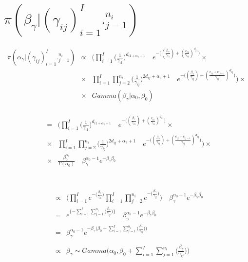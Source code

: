 \documentclass[10pt]{report}
\theoremstyle{plain}
\begin{document}
\section{$\pi(\beta_\gamma|(\gamma_{ij})_{i=1}^I._{j=1}^{n_i})$}
\begin{eqnarray*}
\pi(\alpha_\gamma|(\gamma_{ij})_{i=1}^I._{j=1}^{n_i}) &\propto& \Bigg(\prod_{i=1}^I \bigg(\frac{1}{\gamma_{i1}}\bigg)^{d_{i1+\alpha_\gamma+1}}\quad e^{-\big((\frac{\beta_\gamma}{\gamma_{i1}})+(\frac{c_{i1}}{\gamma_{i1}})^{d_{i1}}\big)}\times\\
&\times& \prod_{i=1}^I \prod_{j=2}^{n_i} \bigg(\frac{1}{\gamma_{ij}}\bigg)^{2d_{ij}+\alpha_\gamma+1}\quad e^{-\big((\frac{\beta_\gamma}{\gamma_{ij}})+(\frac{c_{ij}+c_{ij-1}}{\gamma_{ij}})^{d_{ij}}\big)}\Bigg)\times \\
&\times& Gamma(\beta_\gamma|\alpha_0,\beta_0)
\end{eqnarray*}
\\
\begin{eqnarray*}
&=&\Bigg(\prod_{i=1}^I \bigg(\frac{1}{\gamma_{i1}}\bigg)^{d_{i1+\alpha_\gamma+1}}\quad e^{-\big((\frac{\beta_\gamma}{\gamma_{i1}})+(\frac{c_{i1}}{\gamma_{i1}})^{d_{i1}}\big)}\times\\
&\times& \prod_{i=1}^I \prod_{j=2}^{n_i} \bigg(\frac{1}{\gamma_{ij}}\bigg)^{2d_{ij}+\alpha_\gamma+1}\quad e^{-\big((\frac{\beta_\gamma}{\gamma_{ij}})+(\frac{c_{ij}+c_{ij-1}}{\gamma_{ij}})^{d_{ij}}\big)}\Bigg)\times \\
&\times& \frac{\beta_0^{\alpha_0}}{\Gamma(\alpha_0)} \quad \beta_\gamma^{\alpha_0-1} e^{-\beta_\gamma\beta_0}
\end{eqnarray*}
\\
\\
\begin{eqnarray*}
&\propto& \Bigg(\prod_{i=1}^I e^{-\big(\frac{\beta_\gamma}{\gamma_{i1}}\big)}\prod_{i=1}^I \prod_{j=2}^{n_i} e^{-\big(\frac{\beta_\gamma}{\gamma_{ij}}\big)}\Bigg) \quad \beta_\gamma^{\alpha_0-1} e^{-\beta_\gamma\beta_0}\\
&=&e^{\{-\sum_{i=1}^I \sum_{j=1}^{n_i}\big(\frac{\beta_\gamma}{\gamma_{ij}}\big)\}}\quad \beta_\gamma^{\alpha_0-1} e^{-\beta_\gamma\beta_0}\\
&=& \beta_\gamma^{\alpha_0-1} e^{-\beta_\gamma\big(\beta_0+\sum_{i=1}^I \sum_{j=1}^{n_i}\big(\frac{\beta_\gamma}{\gamma_{ij}}\big))}\\
\\
&\propto& \beta_\gamma \sim Gamma\Bigg(\alpha_0,\beta_0+\sum_{i=1}^I \sum_{j=1}^{n_i}\big(\frac{\beta_\gamma}{\gamma_{ij}}\big)\Bigg)
\end{eqnarray*}
\\
\\
\\
\\
\end{document}
